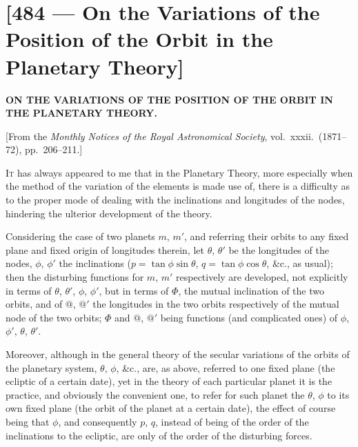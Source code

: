 \documentclass[11pt,a4paper]{article}
\theoremstyle{plain}
\theoremstyle{definition}
\theoremstyle{remark}
\begin{document}
\vspace{2em}

\newpage
\section*{[484 --- On the Variations of the Position of the Orbit in the Planetary Theory]}


\begin{center}
\textbf{ON THE VARIATIONS OF THE POSITION OF THE ORBIT IN THE PLANETARY THEORY.}
\end{center}

[From the \textit{Monthly Notices of the Royal Astronomical Society}, vol.\ xxxii.\ (1871--72), pp.\ 206--211.]

\bigskip

\textsc{It} has always appeared to me that in the Planetary Theory, more especially when the method of the variation of the elements is made use of, there is a difficulty as to the proper mode of dealing with the inclinations and longitudes of the nodes, hindering the ulterior development of the theory.

Considering the case of two planets $m$, $m'$, and referring their orbits to any fixed plane and fixed origin of longitudes therein, let $\theta$, $\theta'$ be the longitudes of the nodes, $\phi$, $\phi'$ the inclinations ($p=\tan\phi\sin\theta$, $q=\tan\phi\cos\theta$, \&c., as usual); then the disturbing functions for $m$, $m'$ respectively are developed, not explicitly in terms of $\theta$, $\theta'$, $\phi$, $\phi'$, but in terms of $\Phi$, the mutual inclination of the two orbits, and of $@$, $@'$ the longitudes in the two orbits respectively of the mutual node of the two orbits; $\Phi$ and $@$, $@'$ being functions (and complicated ones) of $\phi$, $\phi'$, $\theta$, $\theta'$.

Moreover, although in the general theory of the secular variations of the orbits of the planetary system, $\theta$, $\phi$, \&c., are, as above, referred to one fixed plane (the ecliptic of a certain date), yet in the theory of each particular planet it is the practice, and obviously the convenient one, to refer for such planet the $\theta$, $\phi$ to its own fixed plane (the orbit of the planet at a certain date), the effect of course being that $\phi$, and consequently $p$, $q$, instead of being of the order of the inclinations to the ecliptic, are only of the order of the disturbing forces.
\end{document}
